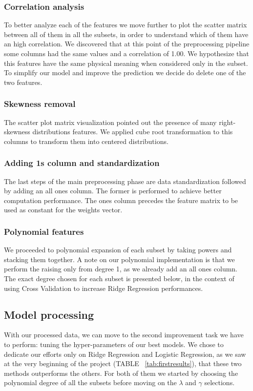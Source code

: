 \documentclass[10pt,article]{IEEEtran}
\begin{document}
\subsubsection{Correlation analysis} To better analyze each of the features we move further to plot the scatter matrix between all of them in all the subsets, in order to understand which of them have an high correlation. We discovered that at this point of the preprocessing pipeline some columns had the same values and a correlation of 1.00. We hypothesize that this features have the same physical meaning when considered only in the subset. To simplify our model and improve the prediction we decide do delete one of the two features.
\subsubsection{Skewness removal} The scatter plot matrix visualization pointed out the presence of many right-skewness distributions features. We applied cube root transformation to this columns to transform them into centered distributions.
\subsubsection{Adding 1s column and standardization} The last steps of the main preprocessing phase are data standardization followed by adding an all ones column. The former is performed to achieve better computation performance. The ones column precedes the feature matrix to be used as constant for the weights vector.
\subsubsection{Polynomial features} We proceeded to polynomial expansion of each subset by taking powers and stacking them together. A note on our polynomial implementation is that we perform the raising only from degree 1, as we already add an all ones column. The exact degree chosen for each subset is presented below, in the context of using Cross Validation to increase Ridge Regression performances.

\subsection{Model processing}
\label{subsec:model-proc}
With our processed data, we can move to the second improvement task we have to perform: tuning the hyper-parameters of our best models.
We chose to dedicate our efforts only on Ridge Regression and Logistic Regression, as we saw at the very beginning of the project (TABLE ~\ref{tab:firstresults}), that these two methods outperforms the others. For both of them we started by choosing the polynomial degree of all the subsets before moving on the $\lambda$ and $\gamma$ selections.
\end{document}
